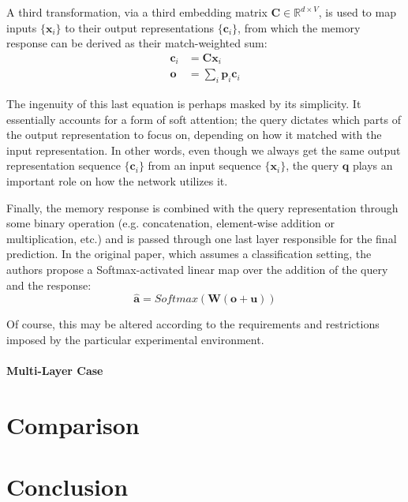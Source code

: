 \documentclass[]{article}
\begin{document}
A third transformation, via a third embedding matrix $\pmb{C} \in \mathbb{R}^{d\times V}$, is used to map inputs $\{\pmb{x}_i\}$ to their output representations $\{\pmb{c}_i\}$, from which the memory response can be derived as their match-weighted sum:
\begin{align}
\tag{Output Transformation}
\pmb{c}_i &= \pmb{C}\pmb{x}_i\\
\tag{Memory Response}
\pmb{o} &= \sum\limits_i{\pmb{p}_i\pmb{c}_i}
\end{align}

The ingenuity of this last equation is perhaps masked by its simplicity. It essentially accounts for a form of soft attention; the query dictates which parts of the output representation to focus on, depending on how it matched with the input representation. In other words, even though we always get the same output representation sequence $\{\pmb{c}_i\}$ from an input sequence $\{\pmb{x}_i\}$, the query $\pmb{q}$ plays an important role on how the network utilizes it.

Finally, the memory response is combined with the query representation through some binary operation (e.g. concatenation, element-wise addition or multiplication, etc.) and is passed through one last layer responsible for the final prediction. In the original paper, which assumes a classification setting, the authors propose a Softmax-activated linear map over the addition of the query and the response:
\[
\tag{Final Prediction}
\hat{\pmb{a}} = Softmax(\pmb{W} (\pmb{o}+\pmb{u}))
\]

Of course, this may be altered according to the requirements and restrictions imposed by the particular experimental environment. 

\paragraph{Multi-Layer Case}


\section{Comparison}

\section{Conclusion}
\end{document}
